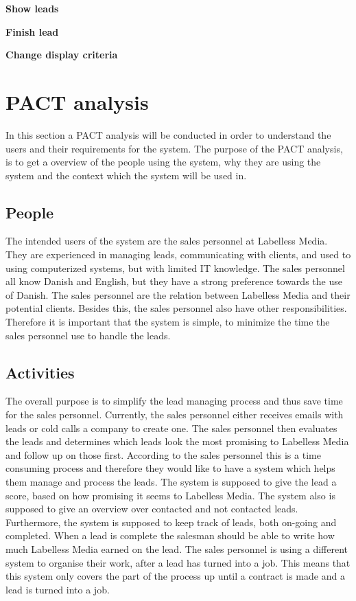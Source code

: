 \textbf{Show leads}

\textbf{Finish lead}

\textbf{Change display criteria}

\section{PACT analysis}
In this section a PACT analysis will be conducted in order to understand the users and their requirements for the system.
The purpose of the PACT analysis, is to get a overview of the people using the system, why they are using the system and the context which the system will be used in.

\subsection{People}
The intended users of the system are the sales personnel at Labelless Media. They are experienced in managing leads, communicating with clients, and used to using computerized systems, but with limited IT knowledge. The sales personnel all know Danish and English, but they have a strong preference towards the use of Danish. The sales personnel are the relation between Labelless Media and their potential clients. Besides this, the sales personnel also have other responsibilities. Therefore it is important that the system is simple, to minimize the time the sales personnel use to handle the leads. 
\newline \noindent

\subsection{Activities}
The overall purpose is to simplify the lead managing process and thus save time for the sales personnel. Currently, the sales personnel either receives emails with leads or cold calls a company to create one. The sales personnel then evaluates the leads and determines which leads look the most promising to Labelless Media and follow up on those first. According to the sales personnel this is a time consuming process and therefore they would like to have a system which helps them manage and process the leads. The system is supposed to give the lead a score, based on how promising it seems to Labelless Media. The system also  is supposed to give an overview over contacted and not contacted leads. Furthermore, the system is supposed to keep track of leads, both on-going and completed. When a lead is complete the salesman should be able to write how much Labelless Media earned on the lead.  The sales personnel is using a different system to organise their work, after a lead has turned into a job. This means that this system only covers the part of the process up until a contract is made and a lead is turned into a job.

